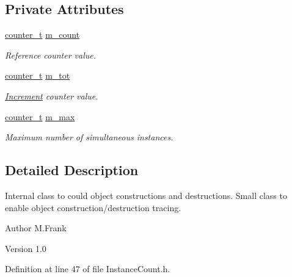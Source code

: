 \subsection*{Private Attributes}
\begin{DoxyCompactItemize}
\item 
\hyperlink{struct_d_d4hep_1_1_instance_count_ae81dc0c76b135425e14b6dc38262a727}{counter\_\-t} \hyperlink{class_d_d4hep_1_1_instance_count_1_1_counter_add94845aa9120ee3daa350d46f2ee919}{m\_\-count}
\begin{DoxyCompactList}\small\item\em Reference counter value. \item\end{DoxyCompactList}\item 
\hyperlink{struct_d_d4hep_1_1_instance_count_ae81dc0c76b135425e14b6dc38262a727}{counter\_\-t} \hyperlink{class_d_d4hep_1_1_instance_count_1_1_counter_aecd05cbfb249522b056b6e0c7f163c63}{m\_\-tot}
\begin{DoxyCompactList}\small\item\em \hyperlink{struct_d_d4hep_1_1_increment}{Increment} counter value. \item\end{DoxyCompactList}\item 
\hyperlink{struct_d_d4hep_1_1_instance_count_ae81dc0c76b135425e14b6dc38262a727}{counter\_\-t} \hyperlink{class_d_d4hep_1_1_instance_count_1_1_counter_a037706f44071d417950579ff8627732b}{m\_\-max}
\begin{DoxyCompactList}\small\item\em Maximum number of simultaneous instances. \item\end{DoxyCompactList}\end{DoxyCompactItemize}


\subsection{Detailed Description}
Internal class to could object constructions and destructions. Small class to enable object construction/destruction tracing.

\begin{DoxyAuthor}{Author}
M.Frank 
\end{DoxyAuthor}
\begin{DoxyVersion}{Version}
1.0 
\end{DoxyVersion}


Definition at line 47 of file InstanceCount.h.

